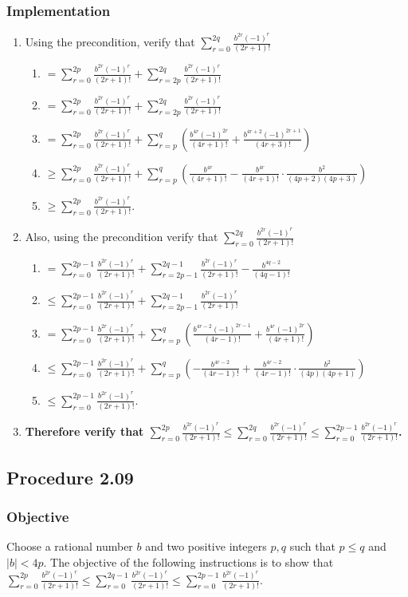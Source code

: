 \documentclass[twocolumn]{article}
\newcommand{\procedure}[2][]{\subsection*{Procedure #2 \ifthenelse{\equal{#1}{}}{}{(#1)}}\label{sec:procedure #2}}
\newcommand{\objective}{\subsubsection*{Objective}}
\newcommand{\implementation}{\subsubsection*{Implementation}}
\begin{document}
			\implementation
				\begin{enumerate}
					\item Using the precondition, verify that $\sum_{r=0}^{2q}\frac{b^{2r}(-1)^r}{(2r+1)!}$
					\begin{enumerate}
						\item $=\sum_{r=0}^{2p}\frac{b^{2r}(-1)^r}{(2r+1)!}+\sum_{r=2p}^{2q}\frac{b^{2r}(-1)^r}{(2r+1)!}$
						\item $=\sum_{r=0}^{2p}\frac{b^{2r}(-1)^r}{(2r+1)!}+\sum_{r=2p}^{2q}\frac{b^{2r}(-1)^r}{(2r+1)!}$
						\item $=\sum_{r=0}^{2p}\frac{b^{2r}(-1)^r}{(2r+1)!}+\sum_{r=p}^{q}(\frac{b^{4r}(-1)^{2r}}{(4r+1)!}+\frac{b^{4r+2}(-1)^{2r+1}}{(4r+3)!})$
						\item $\ge\sum_{r=0}^{2p}\frac{b^{2r}(-1)^r}{(2r+1)!}+\sum_{r=p}^{q}(\frac{b^{4r}}{(4r+1)!}-\frac{b^{4r}}{(4r+1)!}\cdot\frac{b^2}{(4p+2)(4p+3)})$
						\item $\ge\sum_{r=0}^{2p}\frac{b^{2r}(-1)^r}{(2r+1)!}$.
					\end{enumerate}
					\item Also, using the precondition verify that $\sum_{r=0}^{2q}\frac{b^{2r}(-1)^r}{(2r+1)!}$
					\begin{enumerate}
						\item $=\sum_{r=0}^{2p-1}\frac{b^{2r}(-1)^r}{(2r+1)!}+\sum_{r=2p-1}^{2q-1}\frac{b^{2r}(-1)^r}{(2r+1)!}-\frac{b^{4q-2}}{(4q-1)!}$
						\item $\le\sum_{r=0}^{2p-1}\frac{b^{2r}(-1)^r}{(2r+1)!}+\sum_{r=2p-1}^{2q-1}\frac{b^{2r}(-1)^r}{(2r+1)!}$
						\item $=\sum_{r=0}^{2p-1}\frac{b^{2r}(-1)^r}{(2r+1)!}+\sum_{r=p}^{q}(\frac{b^{4r-2}(-1)^{2r-1}}{(4r-1)!}+\frac{b^{4r}(-1)^{2r}}{(4r+1)!})$
						\item $\le\sum_{r=0}^{2p-1}\frac{b^{2r}(-1)^r}{(2r+1)!}+\sum_{r=p}^{q}(-\frac{b^{4r-2}}{(4r-1)!}+\frac{b^{4r-2}}{(4r-1)!}\cdot\frac{b^2}{(4p)(4p+1)})$
						\item $\le\sum_{r=0}^{2p-1}\frac{b^{2r}(-1)^r}{(2r+1)!}$.
					\end{enumerate}
					\item \textbf{Therefore verify that $\sum_{r=0}^{2p}\frac{b^{2r}(-1)^r}{(2r+1)!}\le\sum_{r=0}^{2q}\frac{b^{2r}(-1)^r}{(2r+1)!}\le\sum_{r=0}^{2p-1}\frac{b^{2r}(-1)^r}{(2r+1)!}$.}
				\end{enumerate}
		\procedure{2.09}
			\objective
				Choose a rational number $b$ and two positive integers $p,q$ such that $p\le q$ and $\lvert b\rvert<4p$. The objective of the following instructions is to show that $\sum_{r=0}^{2p}\frac{b^{2r}(-1)^r}{(2r+1)!}\le\sum_{r=0}^{2q-1}\frac{b^{2r}(-1)^r}{(2r+1)!}\le\sum_{r=0}^{2p-1}\frac{b^{2r}(-1)^r}{(2r+1)!}$.
\end{document}

